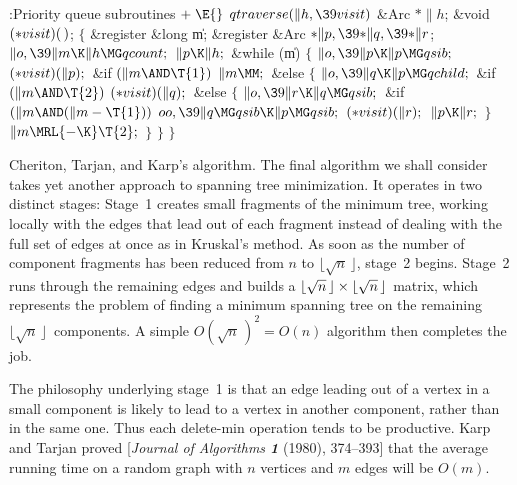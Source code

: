 \Y\B\4:Priority queue subroutines\X${}\mathrel+\E{}$\6
\1\1${}\\{qtraverse}(\|h,\39\\{visit}){}$\6
\&{Arc} ${}{*}\|h{}$;\6
\&{void} ${}({*}\\{visit})(\,){}$;\2%
\2\6
${}\{{}$\5
\1\&{register} \&{long} \|m;\6
\&{register} \&{Arc} ${}{*}\|p,\39{*}\|q,\39{*}\|r{}$;\7
${}\|o,\39\|m\K\|h\MG\\{qcount};{}$\6
${}\|p\K\|h;{}$\6
\&{while} (\|m)\5
${}\{{}$\1\6
${}\|o,\39\|p\K\|p\MG\\{qsib};{}$\6
${}({*}\\{visit})(\|p);{}$\6
\&{if} ${}(\|m\AND\T{1}){}$\1\5
${}\|m\MM;{}$\2\6
\&{else}\5
${}\{{}$\1\6
${}\|o,\39\|q\K\|p\MG\\{qchild};{}$\6
\&{if} ${}(\|m\AND\T{2}){}$\1\5
${}({*}\\{visit})(\|q);{}$\2\6
\&{else}\5
${}\{{}$\1\6
${}\|o,\39\|r\K\|q\MG\\{qsib};{}$\6
\&{if} ${}(\|m\AND(\|m-\T{1})){}$\1\5
${}\\{oo},\39\|q\MG\\{qsib}\K\|p\MG\\{qsib};{}$\2\6
${}({*}\\{visit})(\|r);{}$\6
${}\|p\K\|r;{}$\6
\4${}\}{}$\2\6
${}\|m\MRL{-{\K}}\T{2};{}$\6
\4${}\}{}$\2\6
\4${}\}{}$\2\6
\4${}\}{}$\2\par
\fi

Cheriton, Tarjan, and Karp's algorithm.
\def\lsqrtn{\hbox{$\lfloor\sqrt n\,\rfloor$}}%
\def\usqrtn{\hbox{$\lfloor\sqrt{n+1}+{1\over2}\rfloor$}}%
The final algorithm we shall consider takes yet another approach to
spanning tree minimization. It operates in two distinct stages: Stage~1
creates small fragments of the minimum tree, working locally with the
edges that lead out of each fragment instead of dealing with the
full set of edges at once as in Kruskal's method. As soon as the
number of component fragments has been reduced from $n$ to \lsqrtn,
stage~2 begins. Stage~2 runs through the remaining edges and builds a
$\lsqrtn\times\lsqrtn$ matrix, which represents the problem of
finding a minimum spanning tree on the remaining \lsqrtn\ components.
A simple $O(\sqrt n\,)^2=O(n)$ algorithm then completes the job.

The philosophy underlying stage~1 is that an edge leading out of a
vertex in a small component is likely to lead to a vertex in another
component, rather than in the same one. Thus each delete-min operation
tends to be productive. Karp and Tarjan proved [{\sl Journal of Algorithms\/
\bf1} (1980), 374--393] that the average running time on a random graph with
$n$ vertices and $m$ edges will be $O(m)$.

